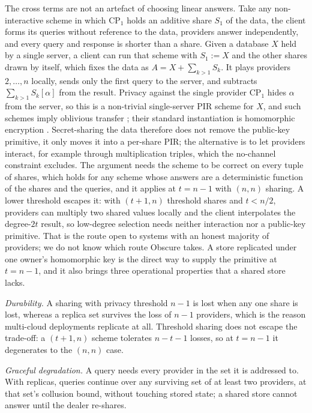 \documentclass[a4paper,fleqn]{cas-sc}
\begin{document}
The cross terms are not an artefact of choosing linear answers. Take any
non-interactive scheme in which $\text{CP}_1$ holds an additive share $S_1$ of
the data, the client forms its queries without reference to the data,
providers answer independently, and every query and response is shorter than a
share. Given a database $X$ held by a single server, a client
can run that scheme with $S_1:=X$ and the other shares drawn by itself, which
fixes the data as $A=X+\sum_{k>1}S_k$. It plays providers $2,\dots,n$ locally,
sends only the first query to the server, and subtracts $\sum_{k>1}S_k[\alpha]$
from the result. Privacy against the single provider $\text{CP}_1$ hides
$\alpha$ from the server, so this is a non-trivial single-server PIR scheme for
$X$, and such schemes imply oblivious transfer \citep{dicrescenzo2000single};
their standard instantiation is homomorphic encryption
\citep{kushilevitz1997replication}. Secret-sharing the data therefore does not
remove the public-key primitive, it only moves it into a per-share PIR; the
alternative is to let providers interact, for example through multiplication
triples, which the no-channel constraint excludes. The argument needs the
scheme to be correct on every tuple of shares, which holds for any scheme whose
answers are a deterministic function of the shares and the queries, and it
applies at $t=n-1$ with $(n,n)$ sharing. A lower threshold escapes it: with
$(t{+}1,n)$ threshold shares and $t<n/2$, providers can multiply two shared
values locally and the client interpolates the degree-$2t$ result, so
low-degree selection needs neither interaction nor a public-key primitive. That
is the route open to systems with an honest majority of providers; we do not
know which route Obscure \citep{gupta2020obscure} takes. A store replicated
under one owner's homomorphic key is the direct way to supply the primitive at
$t=n-1$, and it also brings three operational properties that a shared store
lacks.

\emph{Durability.} A sharing with privacy threshold $n-1$ is lost when any one
share is lost, whereas a replica set survives the loss of $n-1$ providers,
which is the reason multi-cloud deployments replicate at all. Threshold
sharing does not escape the trade-off: a $(t{+}1,n)$ scheme tolerates
$n-t-1$ losses, so at $t=n-1$ it degenerates to the $(n,n)$ case.

\emph{Graceful degradation.} A query needs every provider in the set it is
addressed to. With replicas, queries continue over any surviving set of at
least two providers, at that set's collusion bound, without touching stored
state; a shared store cannot answer until the dealer re-shares.
\end{document}
